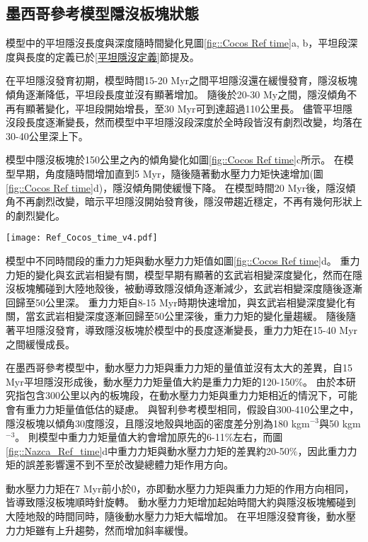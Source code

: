 \subsection{墨西哥參考模型隱沒板塊狀態}
模型中的平坦隱沒長度與深度隨時間變化見圖\ref{fig::Cocos Ref time}a, b，平坦段深度與長度的定義已於\ref{平坦隱沒定義}節提及。

在平坦隱沒發育初期，模型時間15-20 Myr之間平坦隱沒還在緩慢發育，隱沒板塊傾角逐漸降低，平坦段長度並沒有顯著增加。
隨後於20-30 My之間，隱沒傾角不再有顯著變化，平坦段開始增長，至30 Myr可到達超過110公里長。
儘管平坦隱沒段長度逐漸變長，然而模型中平坦隱沒段深度於全時段皆沒有劇烈改變，均落在30-40公里深上下。

模型中隱沒板塊於150公里之內的傾角變化如圖\ref{fig::Cocos Ref time}c所示。
在模型早期，角度隨時間增加直到5 Myr，隨後隨著動水壓力力矩快速增加(圖\ref{fig::Cocos Ref time}d)，隱沒傾角開使緩慢下降。
在模型時間20 Myr後，隱沒傾角不再劇烈改變，暗示平坦隱沒開始發育後，隱沒帶趨近穩定，不再有幾何形狀上的劇烈變化。

\begin{figure*}[hb]
    \centering
    \texttt{[image: Ref\_Cocos\_time\_v4.pdf]}
    \caption[墨西哥參考模型隱沒板塊狀態隨時間變化]{墨西哥參考模型隱沒板塊狀態隨時間變化。灰底為模型中之平坦隱沒時期。(a)參考模型平坦段長度隨時間變化(b)參考模型平坦段深度隨時間變化，灰虛線為\citealp{Manea2017}中提及之墨西哥平坦隱沒平坦段深度約落在35公里深。(c)粉紅線為參考模型隱沒板塊自海溝到深度150公里之傾角，黑線則為參考模型隱沒板塊自海溝到深度60公里之傾角。(d)參考模型中重力力矩與動水壓力力矩隨時間變化。其中粉紅色線為重力力矩，深藍色線為動水壓力力矩。兩者皆有做1 Myr的移動平均。灰虛線標示力矩0。}
    \label{fig::Cocos Ref time}
\end{figure*}

模型中不同時間段的重力力矩與動水壓力力矩值如圖\ref{fig::Cocos Ref time}d。
重力力矩的變化與玄武岩相變有關，模型早期有顯著的玄武岩相變深度變化，然而在隱沒板塊觸碰到大陸地殼後，被動導致隱沒傾角逐漸減少，玄武岩相變深度隨後逐漸回歸至50公里深。
重力力矩自8-15 Myr時期快速增加，與玄武岩相變深度變化有關，當玄武岩相變深度逐漸回歸至50公里深後，重力力矩的變化量趨緩。
隨後隨著平坦隱沒發育，導致隱沒板塊於模型中的長度逐漸變長，重力力矩在15-40 Myr之間緩慢成長。

在墨西哥參考模型中，動水壓力力矩與重力力矩的量值並沒有太大的差異，自15 Myr平坦隱沒形成後，動水壓力力矩量值大約是重力力矩的120-150$\%$。
由於本研究指包含300公里以內的板塊段，在動水壓力力矩與重力力矩相近的情況下，可能會有重力力矩量值低估的疑慮。
與智利參考模型相同，假設自300-410公里之中，隱沒板塊以傾角30度隱沒，且隱沒地殼與地函的密度差分別為180 kgm$^{-3}$與50 kgm$^{-3}$。
則模型中重力力矩量值大約會增加原先的6-11$\%$左右，而圖\ref{fig::Nazca_Ref_time}d中重力力矩與動水壓力力矩的差異約20-50$\%$，因此重力力矩的誤差影響還不到不至於改變總體力矩作用方向。

動水壓力力矩在7 Myr前小於0，亦即動水壓力力矩與重力力矩的作用方向相同，皆導致隱沒板塊順時針旋轉。
動水壓力力矩增加起始時間大約與隱沒板塊觸碰到大陸地殼的時間同時，隨後動水壓力力矩大幅增加。
在平坦隱沒發育後，動水壓力力矩雖有上升趨勢，然而增加斜率緩慢。
